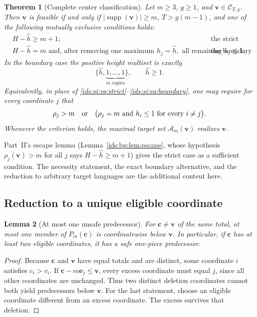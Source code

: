 \documentclass[11pt,letterpaper]{article}
\newtheorem{theorem}{Theorem}[section]
\newtheorem{lemma}[theorem]{Lemma}
\theoremstyle{definition}\newtheorem{definition}[theorem]{Definition}
\theoremstyle{remark}\newtheorem{remark}[theorem]{Remark}
\theoremstyle{definition}\newtheorem{question}[theorem]{Question}
\DeclareMathOperator{\supp}{supp}
\newcommand{\bpC}[2]{\mathcal C_{#1,#2}}
\newcommand{\Adm}[1]{\mathcal A_m(#1)}
\begin{document}
\begin{theorem}[Complete center classification]\label{ids:si:thm:classification}
Let $m\geq3$, $g\geq1$, and $\mathbf v\in\bpC{T}{g}$. Then $\mathbf v$ is feasible
if and only if $|\supp(\mathbf v)|\geq m$, $T>g(m-1)$, and one of the following
mutually exclusive conditions holds:
\begin{align}
 &H-\hat h\geq m+1; &&\text{the strict case,}\label{ids:si:eq:strict}\\
 &H-\hat h=m\text{ and, after removing one maximum }h_j=\hat h,
       \text{ all remaining }h_i\leq1;
       &&\text{the boundary case.}\label{ids:si:eq:boundary}
\end{align}
In the boundary case the positive height multiset is exactly
\begin{equation}\label{ids:si:eq:boundarymultiset}
 \{\hat h,\underbrace{1,\ldots,1}_{m\text{ copies}}\},\qquad \hat h\geq1.
\end{equation}
Equivalently, in place of \eqref{ids:si:eq:strict}--\eqref{ids:si:eq:boundary}, one may
require for every coordinate $j$ that
\begin{equation}\label{ids:si:eq:localcriterion}
 \rho_j>m\quad\hbox{or}\quad
 \bigl(\rho_j=m\text{ and }h_i\leq1\text{ for every }i\ne j\bigr).
\end{equation}
Whenever the criterion holds, the maximal target set $\Adm{\mathbf v}$ realizes
$\mathbf v$.
\end{theorem}
Part~II's escape lemma (Lemma~\ref{ids:bp:lem:escape}, whose hypothesis
$\rho_j(\mathbf v)>m$ for all $j$ says $H-\hat h\geq m+1$) gives the strict
case as a sufficient condition.
The necessity statement, the exact boundary alternative, and the reduction
to arbitrary target languages are the additional content here.

\subsection{Reduction to a unique eligible coordinate}
\begin{lemma}[At most one unsafe predecessor]\label{ids:si:lem:onebad}
For $\mathbf c\ne\mathbf v$ of the same total, at most one member of $P_m(\mathbf c)$ is
coordinatewise below $\mathbf v$. In particular, if $\mathbf c$ has at least two
eligible coordinates, it has a safe one-piece predecessor.
\end{lemma}
\begin{proof}
Because $\mathbf c$ and $\mathbf v$ have equal totals and are distinct, some coordinate
$i$ satisfies $c_i>v_i$. If $\mathbf c-m\mathbf e_j\leq\mathbf v$, every excess coordinate
must equal $j$, since all other coordinates are unchanged. Thus two distinct
deletion coordinates cannot both yield predecessors below $\mathbf v$. For the
last statement, choose an eligible coordinate different from an excess
coordinate. The excess survives that deletion.
\end{proof}
\end{document}
